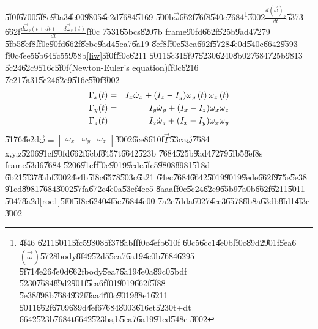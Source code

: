 \documentclass[12pt,a4paper]{article}
\begin{document}
\U{5f0f}\U{6700}\U{5f8c}\U{90a3}\U{4e00}\U{9805}\U{4e2d}\U{7684}\U{5169}%
\U{500b}$\vec{\omega}$\U{662f}\U{76f8}\U{540c}\U{7684}\footnote{\U{4f46}%
\U{6211}\U{5011}\U{5fc5}\U{9808}\U{5f37}\U{8abf}\U{ff0c}\U{4efb}\U{610f}%
\U{60c5}\U{6cc1}\U{4e0b}\U{ff0c}\U{89d2}\U{901f}\U{5ea6}$\left( \vec{\omega}%
\right) $\U{5728}body\U{8f49}\U{52d5}\U{5ea7}\U{6a19}\U{4e0b}\U{7684}\U{6295}%
\U{5f71}\U{4e26}\U{4e0d}\U{662f}body\U{5ea7}\U{6a19}\U{4e0a}\U{89c0}\U{5bdf}%
\U{5230}\U{7684}\U{89d2}\U{901f}\U{5ea6}\U{ff01}\U{9019}\U{662f}\U{5f88}%
\U{5e38}\U{898b}\U{7684}\U{932f}\U{8aa4}\U{ff0c}\U{9019}\U{88e1}\U{6211}%
\U{5011}\U{662f}\U{6709}\U{689d}\U{4ef6}\U{7684}\U{8003}\U{616e}t\U{5230}t+dt%
\U{6642}\U{523b}\U{7684}t\U{6642}\U{523b}s,b\U{5ea7}\U{6a19}\U{91cd}\U{548c}%
\U{3002}}\U{3002}$\frac{d\left( \vec{\omega}\right) _{b}}{dt}$\U{5373}%
\U{662f}$\frac{d\vec{\omega}_{b}(t+dt)-d\vec{\omega}_{s}(t)}{dt}$\U{ff0c}%
\U{7531}\U{65bc}s\U{8207}b frame\U{90fd}\U{662f}\U{525b}\U{9ad4}\U{7279}%
\U{5fb5}\U{8ef8}\U{ff0c}\U{90fd}\U{662f}\U{8cbc}\U{9ad4}\U{5ea7}\U{6a19}%
\U{8ef8}\U{ff0c}\U{53ea}\U{662f}\U{5728}\U{4e0d}\U{540c}\U{6642}\U{9593}%
\U{ff0c}\U{4ee5}\U{6b64}\U{5c55}\U{958b}\ref{liw}\U{5f0f}\U{ff0c}\U{6211}%
\U{5011}\U{5c31}\U{5f97}\U{5230}\U{6240}\U{8b02}\U{7684}\U{725b}\U{9813}%
\U{5c24}\U{62c9}\U{516c}\U{5f0f}(Newton-Euler's equation)\U{ff0c}\U{6216}%
\U{7c21}\U{7a31}\U{5c24}\U{62c9}\U{516c}\U{5f0f}\U{3002}%
\begin{eqnarray}
\Gamma _{x}(t) &=&I_{x}\dot{\omega}_{x}+(I_{z}-I_{y})\omega _{y}\left(
t\right) \omega _{z}\left( t\right)  \notag \\
\Gamma _{y}(t) &=&I_{y}\dot{\omega}_{y}+(I_{x}-I_{z})\omega _{x}\omega _{z}
\label{eulereqbody} \\
\Gamma _{z}(t) &=&I_{z}\dot{\omega}_{z}+(I_{x}-I_{y})\omega _{x}\omega _{y} 
\notag
\end{eqnarray}%
\U{5176}\U{4e2d}$\vec{\omega}=\left[ 
\begin{array}{ccc}
\omega _{x} & \omega _{y} & \omega _{z}%
\end{array}%
\right] $\U{3002}\U{6ce8}\U{610f}$\vec{\Gamma}$\U{53ca}$\vec{\omega}$\U{7684}%
x,y,z\U{5206}\U{91cf}\U{90fd}\U{662f}\U{6cbf}\U{8457}t\U{6642}\U{523b}%
\U{7684}\U{525b}\U{9ad4}\U{7279}\U{5fb5}\U{8ef8}s frame\U{53d6}\U{7684}%
\U{5206}\U{91cf}\U{ff0c}\U{9019}\U{9ede}\U{5fc5}\U{9808}\U{8981}\U{518d}%
\U{6b21}\U{5f37}\U{8abf}\U{3002}\U{4e4b}\U{5f8c}\U{6578}\U{503c}\U{6a21}%
\U{64ec}\U{7684}\U{6642}\U{5019}\U{9019}\U{9ede}\U{662f}\U{975e}\U{5e38}%
\U{91cd}\U{8981}\U{7684}\U{3002}\U{57fa}\U{672c}\U{4e0a}\U{53ef}\U{4ee5}%
\U{8aaa}\U{ff0c}\U{5c24}\U{62c9}\U{65b9}\U{7a0b}\U{662f}\U{6211}\U{5011}%
\U{5047}\U{8a2d}\ref{roc1}\U{5f0f}\U{5f8c}\U{6240}\U{4f5c}\U{7684}\U{4e00}%
\U{7a2e}\U{7dda}\U{6027}\U{4ee3}\U{6578}\U{8b8a}\U{63db}\U{8fd1}\U{4f3c}%
\U{3002}
\end{document}
